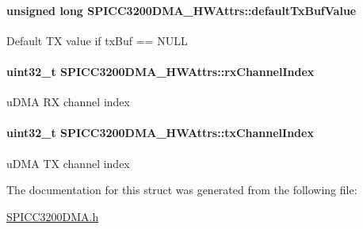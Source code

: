 \paragraph[{default\+Tx\+Buf\+Value}]{\setlength{\rightskip}{0pt plus 5cm}unsigned long S\+P\+I\+C\+C3200\+D\+M\+A\+\_\+\+H\+W\+Attrs\+::default\+Tx\+Buf\+Value}\label{struct_s_p_i_c_c3200_d_m_a___h_w_attrs_a37cb12ed86423d12f273637dfe2aef47}
Default T\+X value if tx\+Buf == N\+U\+L\+L 
\paragraph[{rx\+Channel\+Index}]{\setlength{\rightskip}{0pt plus 5cm}uint32\+\_\+t S\+P\+I\+C\+C3200\+D\+M\+A\+\_\+\+H\+W\+Attrs\+::rx\+Channel\+Index}\label{struct_s_p_i_c_c3200_d_m_a___h_w_attrs_af577e5b6488f282f910e7dbd733329f4}
u\+D\+M\+A R\+X channel index 
\paragraph[{tx\+Channel\+Index}]{\setlength{\rightskip}{0pt plus 5cm}uint32\+\_\+t S\+P\+I\+C\+C3200\+D\+M\+A\+\_\+\+H\+W\+Attrs\+::tx\+Channel\+Index}\label{struct_s_p_i_c_c3200_d_m_a___h_w_attrs_a1ad85ea904b8d879b260e46ef44d9882}
u\+D\+M\+A T\+X channel index 

The documentation for this struct was generated from the following file\+:\begin{DoxyCompactItemize}
\item 
\hyperlink{_s_p_i_c_c3200_d_m_a_8h}{S\+P\+I\+C\+C3200\+D\+M\+A.\+h}\end{DoxyCompactItemize}

